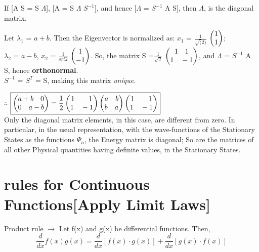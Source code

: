 \documentclass[a4paper, 10pt, onepage]{elegantbook}
\begin{document}
{If [A S = S $\Lambda$], [A = S $\Lambda$ $S^{-1}$], and hence [$\Lambda$ = $S^{-1}$ A S], then $\Lambda$, is the 
diagonal matrix.  

Let $\lambda_1$ = $a + b$. Then the Eigenvector is normalized as: $x_1$ = $\frac{1}{\sqrt(2)}$ $\begin{pmatrix}1 \cr 1 
\end{pmatrix}$; \\

$\lambda_2$ = $a - b$, $x_2$ = $\frac{1}{srt{2}}$ $\begin{pmatrix}1 \cr -1 \end{pmatrix}$. So, the matrix S 
=$\frac{1}{\sqrt{2}}$ $\begin{pmatrix}1\quad 1 \cr 1 \quad -1 \end{pmatrix}$, and $\Lambda$ = $S^{-1}$ A S, hence 
\textbf{orthonormal}. \\

$S^{-1}$ = $S^{T}$ = S, making this matrix \emph{unique}. 

$\therefore$ $\boxed{\begin{pmatrix}a + b \quad 0 \cr0 \quad a - b \end{pmatrix} = \frac{1}{2} \begin{pmatrix}1 \quad 
\quad 1 \cr 1 \quad -1 \end{pmatrix} \begin{pmatrix}a \quad b \cr b \quad a \end{pmatrix} \begin{pmatrix}1 \quad \quad 
1 \cr 1 \quad -1 \end{pmatrix}}$   \\

Only the diagonal matrix elements, in this case, are different from zero. In particular, in the usual representation, 
with the wave-functions of the Stationary States as the functions $\Psi_n$, the Energy matrix is diagonal; So are the 
matrices of all other Physical quantities having definite values, in the Stationary States.   

\section{rules for Continuous Functions[Apply Limit Laws]}

Product rule $\rightarrow$ Let f(x) and g(x) be differential functions. Then,  
\begin{equation}
\boxed{\frac{d}{dx}f(x)g(x) = \frac{d}{dx} [ f(x) \cdot g(x) ] + \frac{d}{dx} [ g(x) \cdot f(x) ]}
\end{equation}

}
\end{document}
